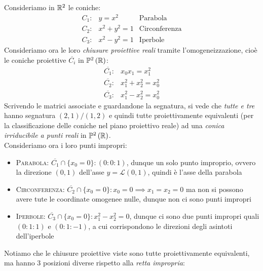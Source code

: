 \begin{examples}
	Consideriamo in $\mathbb{R}^2$ le coniche:
	\begin{equation*}
		\begin{array}{cll}
			C_1\colon & y=x^2 & 	\text{Parabola}\\[1mm]
			C_2\colon & x^2+y^2=1 &		\text{Circonferenza}\\[1mm]
			C_3\colon &	x^2-y^2=1 & \text{Iperbole}
		\end{array}
	\end{equation*}
	Consideriamo ora le loro \textit{chiusure proiettive reali} tramite l'omogeneizzazione, cioè le coniche proiettive $\overline{C_i}$ in $\proj[2]{\realset}$:
		\begin{equation*}
		\begin{array}{cl}
			\overline{C_1} \colon & x_0x_1=x_1^2\\[1mm]
			\overline{C_2} \colon & x_1^2+x_2^2=x_0^2\\[1mm]
			\overline{C_3} \colon & x_1^2-x_2^2=x_0^2
		\end{array}
	\end{equation*}
	Scrivendo le matrici associate e guardandone la segnatura, si vede che \textit{tutte e tre} hanno segnatura $(2,1)/(1,2)$ e quindi tutte proiettivamente equivalenti (per la classificazione delle coniche nel piano proiettivo reale) ad una \textit{conica irriducibile a punti reali} in $\proj[2]{\realset}$.\\
	Consideriamo ora i loro punti impropri:
		\begin{itemize}
			\item \textsc{Parabola}: $\overline{C_1}\cap\{x_0=0\}\colon (0\colon 0\colon 1)$, dunque un solo punto improprio, ovvero la direzione $(0,1)$ dell'asse $y=\mathcal{L}(0,1)$, quindi è l'asse della parabola
			\item \textsc{Circonferenza}: $\overline{C_2}\cap \{x_0=0\} \colon x_0=0 \implies x_1=x_2=0$ ma non si possono avere tute le coordinate omogenee nulle, dunque non ci sono punti impropri 
			\item \textsc{Iperbole}: $\overline{C_3}\cap\{x_0=0\}\colon x_1^2-x_2^2=0$, dunque ci sono	due punti impropri quali $(0\colon 1\colon 1)$ e $(0\colon 1\colon -1)$, a cui corrispondono le direzioni degli asintoti dell'iperbole
		\end{itemize}
	Notiamo che le chiusure proiettive viste sono tutte proiettivamente equivalenti, ma hanno 3 posizioni diverse rispetto alla \textit{retta impropria}:\\

\end{examples}
